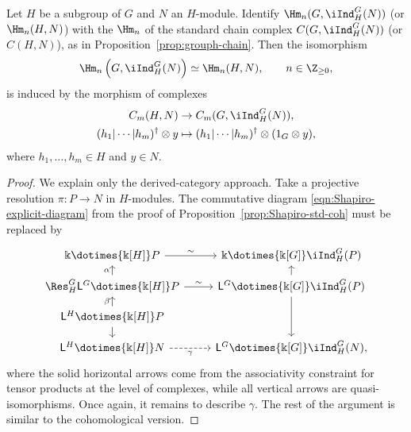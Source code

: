 \begin{proposition}\label{prop:Shapiro-std-ho}
	Let $H$ be a subgroup of $G$ and $N$ an $H$-module. Identify
	$\Hm_n(G,\iInd^G_H(N))$ (or $\Hm_n(H,N)$) with the $\Hm_n$ of the
	standard chain complex $C(G,\iInd^G_H(N))$ (or $C(H,N)$), as in
	Proposition~\ref{prop:grouph-chain}. Then the isomorphism
	\[ \Hm_n\left(G,\iInd^G_H(N)\right)\simeq\Hm_n(H,N),
	\qquad n\in\Z_{\geq0}, \]
	is induced by the morphism of complexes
	\begin{align*}
		C_m(H,N)&\to C_m(G,\iInd^G_H(N)),\\
		(h_1|\cdots|h_m)^\dagger\otimes y
		&\mapsto(h_1|\cdots|h_m)^\dagger\otimes(1_G\otimes y),
	\end{align*}
	where $h_1,\ldots,h_m\in H$ and $y\in N$.
\end{proposition}
\begin{proof}
	We explain only the derived-category approach. Take a projective
	resolution $\pi:P\to N$ in $H$-modules. The commutative diagram
	\eqref{eqn:Shapiro-explicit-diagram} from the proof of
	Proposition~\ref{prop:Shapiro-std-coh} must be replaced by
	\[\begin{tikzcd}[row sep=small]
		\Bbbk\dotimes{\Bbbk[H]}P \arrow[r,"\sim"] &
		\Bbbk\dotimes{\Bbbk[G]}\iInd^G_H(P) \\
		\Res^G_H\mathsf{L}^G\dotimes{\Bbbk[H]}P
		\arrow[r,"\sim"] \arrow[u,"\alpha"] &
		\mathsf{L}^G\dotimes{\Bbbk[G]}\iInd^G_H(P)
		\arrow[u] \arrow[dd] \\
		\mathsf{L}^H\dotimes{\Bbbk[H]}P \arrow[u,"\beta"] \arrow[d] & \\
		\mathsf{L}^H\dotimes{\Bbbk[H]}N \arrow[dashed,r,"\gamma"'] &
		\mathsf{L}^G\dotimes{\Bbbk[G]}\iInd^G_H(N),
	\end{tikzcd}\]
	where the solid horizontal arrows come from the associativity constraint
	for tensor products at the level of complexes, while all vertical arrows
	are quasi-isomorphisms. Once again, it remains to describe $\gamma$. The
	rest of the argument is similar to the cohomological version.
\end{proof}
